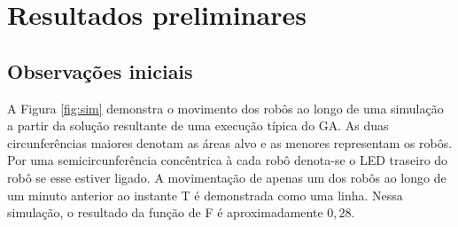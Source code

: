 \chapter{Resultados preliminares}
\label{cha:results}

\section{Observações iniciais}

A Figura \ref{fig:sim} demonstra o movimento dos robôs ao longo de uma simulação a partir da solução resultante de uma execução típica do GA. As duas circunferências maiores denotam as áreas alvo e as menores representam os robôs. Por uma semicircunferência concêntrica à cada robô denota-se o LED traseiro do robô se esse estiver ligado. A movimentação de apenas um dos robôs ao longo de um minuto anterior ao instante T é demonstrada como uma linha. Nessa simulação, o resultado da função de \fitness F é aproximadamente $0,28$.

